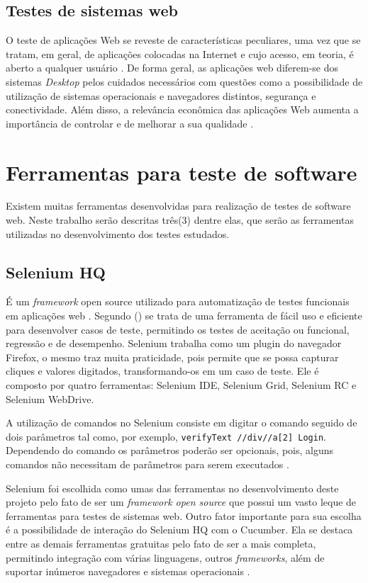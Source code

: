 \documentclass[tg]{mdtufsm}
\begin{document}
\subsection{Testes de sistemas web}
O teste de aplicações Web se reveste de características peculiares, uma vez que se tratam, em geral, de aplicações colocadas na Internet e cujo acesso, em teoria,
é aberto a qualquer usuário \cite{rios2006teste}.  De forma geral, as aplicações web diferem-se dos sistemas \emph{Desktop} pelos cuidados necessários com questões como a
possibilidade de utilização de sistemas operacionais e navegadores distintos, segurança e conectividade. Além disso, a relevância econômica das aplicações Web aumenta a
importância de controlar e de melhorar a sua qualidade \cite{fidelis2004fireweb}.


\section{Ferramentas para teste de software}
Existem muitas ferramentas desenvolvidas para realização de testes de software web. Neste trabalho serão descritas três(3) dentre elas, que serão as ferramentas utilizadas no desenvolvimento dos testes estudados.

\subsection{Selenium HQ}
É um \emph{framework} open source utilizado para automatização de testes funcionais em aplicações web \cite{chiavegatto1desenvolvimento}. Segundo \citeauthor{pereiraestudoselenium} (\citeyear{pereiraestudoselenium}) se trata
de uma ferramenta de fácil uso e eficiente para desenvolver casos de teste, permitindo os testes de aceitação ou funcional, regressão e de desempenho.
Selenium trabalha como um plugin do navegador Firefox, o mesmo traz muita praticidade, pois permite que se possa capturar cliques e valores digitados, transformando-os em um caso de teste. Ele é composto por
quatro ferramentas: Selenium IDE, Selenium Grid, Selenium RC e Selenium WebDrive.

A utilização de comandos no Selenium consiste em digitar o comando seguido de dois parâmetros tal como, por exemplo, \texttt{verifyText //div//a[2] Login}. Dependendo  do comando os parâmetros poderão ser opcionais, pois, alguns comandos não necessitam de parâmetros para serem executados \cite{sixpenceautomatizaccao}.

Selenium foi escolhida como umas das ferramentas no desenvolvimento deste projeto pelo fato de ser um \emph{framework open source} que possui um vasto leque de ferramentas para testes de sistemas web. Outro fator
importante para sua escolha é a possibilidade de interação do Selenium HQ com o Cucumber. Ela se destaca entre as demais ferramentas gratuitas pelo fato de ser a mais completa, permitindo integração com
várias linguagens, outros \emph{frameworks}, além de suportar inúmeros navegadores e sistemas operacionais \cite{pereiraestudoselenium}.
\end{document}
